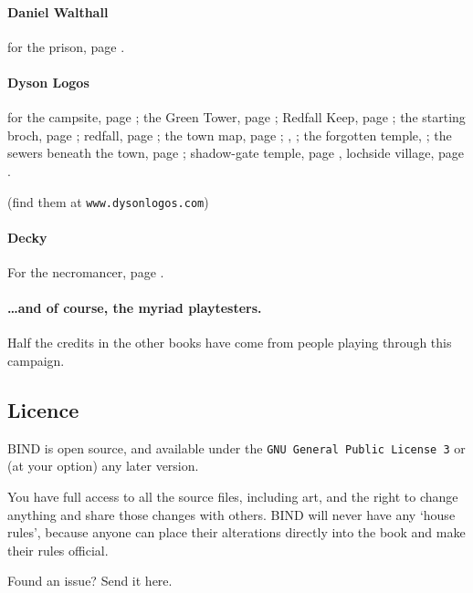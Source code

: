 \begin{multicols}{2}
\paragraph{Daniel Walthall}
for the prison, page \pageref{Daniel_Walthall/prison}.

\paragraph{Dyson Logos}

for the
campsite, page \pageref{Dyson_Logos/forgotten_city};
the Green Tower, page \pageref{Dyson_Logos/green_tower};
Redfall Keep, page \pageref{Dyson_Logos/redfall_keep};
the starting \gls{broch}, page \pageref{Dyson_Logos/broch_map};
\gls{redfall}, page \pageref{Dyson_Logos/redfall};
the town map, page \pageref{Dyson_Logos/town};
, \pageref{Dyson_Logos/mincing_pig};
the forgotten temple, \pageref{Dyson_Logos/qualme_temple};
the sewers beneath the town, page \pageref{Dyson_Logos/sewer};
shadow-gate temple, page \pageref{Dyson_Logos/shadow_gate},
lochside village, page \pageref{Dyson_Logos/lochside}.

(find them at {\tt www.dysonlogos.com})

\paragraph{Decky}

For the necromancer, page \pageref{Decky/necromancer}.

\paragraph{\ldots and of course, the myriad playtesters.}
Half the credits in the other books have come from people playing through this campaign.

\subsection*{Licence}

BIND is open source, and available under the {\tt GNU General Public License 3} or (at your option) any later version.

You have full access to all the source files, including art, and the right to change anything and share those changes with others.
BIND will never have any `house rules', because anyone can place their alterations directly into the book and make their rules official.

\begin{center}
  
  Found an issue?
  Send it here.
\end{center}

\end{multicols}

\pagebreak
